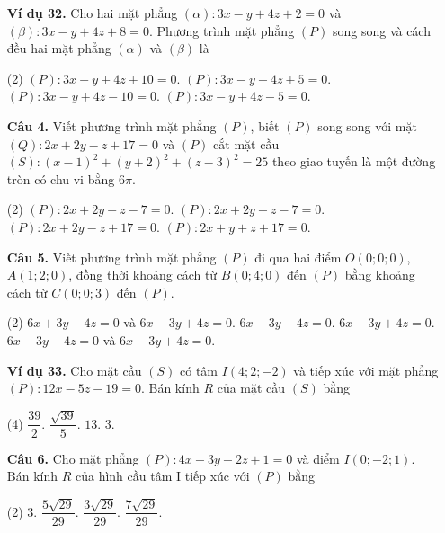 \documentclass[12pt, a4paper]{article}
\begin{document}
\begin{enumerate}[label=\textbf{\arabic*.}, wide=0pt, leftmargin=*]
    \item[\textbf{Ví dụ 32.}] Cho hai mặt phẳng \((\alpha): 3x-y+4z+2=0\) và \((\beta): 3x-y+4z+8=0\). Phương trình mặt phẳng \((P)\) song song và cách đều hai mặt phẳng \((\alpha)\) và \((\beta)\) là
    \begin{tasks}(2)
        \task \((P): 3x-y+4z+10=0\).
        \task \((P): 3x-y+4z+5=0\).
        \task \((P): 3x-y+4z-10=0\).
        \task \((P): 3x-y+4z-5=0\).
    \end{tasks}
    
    \item[\textbf{Câu 4.}] Viết phương trình mặt phẳng \((P)\), biết \((P)\) song song với mặt \((Q): 2x+2y-z+17=0\) và \((P)\) cắt mặt cầu \((S): (x-1)^2+(y+2)^2+(z-3)^2=25\) theo giao tuyến là một đường tròn có chu vi bằng \(6\pi\).
    \begin{tasks}(2)
        \task \((P): 2x+2y-z-7=0\).
        \task \((P): 2x+2y+z-7=0\).
        \task \((P): 2x+2y-z+17=0\).
        \task \((P): 2x+y+z+17=0\).
    \end{tasks}
    
    \item[\textbf{Câu 5.}] Viết phương trình mặt phẳng \((P)\) đi qua hai điểm \(O(0;0;0)\), \(A(1;2;0)\), đồng thời khoảng cách từ \(B(0;4;0)\) đến \((P)\) bằng khoảng cách từ \(C(0;0;3)\) đến \((P)\).
    \begin{tasks}(2)
        \task \(6x+3y-4z=0\) và \(6x-3y+4z=0\).
        \task \(6x-3y-4z=0\).
        \task \(6x-3y+4z=0\).
        \task \(6x-3y-4z=0\) và \(6x-3y+4z=0\).
    \end{tasks}

    \item[\textbf{Ví dụ 33.}] Cho mặt cầu \((S)\) có tâm \(I(4;2;-2)\) và tiếp xúc với mặt phẳng \((P): 12x-5z-19=0\). Bán kính \(R\) của mặt cầu \((S)\) bằng
    \begin{tasks}(4)
        \task \(\dfrac{39}{2}\).
        \task \(\dfrac{\sqrt{39}}{5}\).
        \task \(13\).
        \task \(3\).
    \end{tasks}
    
    \item[\textbf{Câu 6.}] Cho mặt phẳng \((P): 4x+3y-2z+1=0\) và điểm \(I(0;-2;1)\). Bán kính \(R\) của hình cầu tâm I tiếp xúc với \((P)\) bằng
    \begin{tasks}(2)
        \task \(3\).
        \task \(\dfrac{5\sqrt{29}}{29}\).
        \task \(\dfrac{3\sqrt{29}}{29}\).
        \task \(\dfrac{7\sqrt{29}}{29}\).
    \end{tasks}
    

\end{enumerate}
\end{document}
